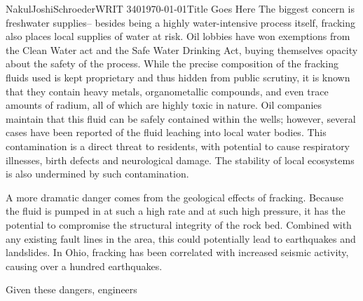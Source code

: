 \documentclass[12pt,letterpaper]{article}
\begin{document}
\begin{mla}{Nakul}{Joshi}{Schroeder}{WRIT 340}{\today}{Title Goes Here}
The biggest concern is freshwater supplies-- besides being a highly water-intensive process itself, fracking also places local supplies of water at risk. Oil lobbies have won exemptions from the Clean Water act and the Safe Water Drinking Act, buying themselves opacity about the safety of the process. While the precise composition of the fracking fluids used is kept proprietary and thus hidden from public scrutiny, it is known that they contain heavy metals, organometallic compounds, and even trace amounts of radium, all of which are highly toxic in nature. Oil companies maintain that this fluid can be safely contained within the wells; however, several cases have been reported of the fluid leaching into local water bodies. This contamination is a direct threat to residents, with potential to cause respiratory illnesses, birth defects and neurological damage. The stability of local ecosystems is also undermined by such contamination. 

A more dramatic danger comes from the geological effects of fracking. Because the fluid is pumped in at such a high rate and at such high pressure, it has the potential to compromise the structural integrity of the rock bed. Combined with any existing fault lines in the area, this could potentially lead to earthquakes and landslides. In Ohio, fracking has been correlated with increased seismic activity, causing over a hundred earthquakes.

Given these dangers, engineers


\end{mla}
\end{document}
